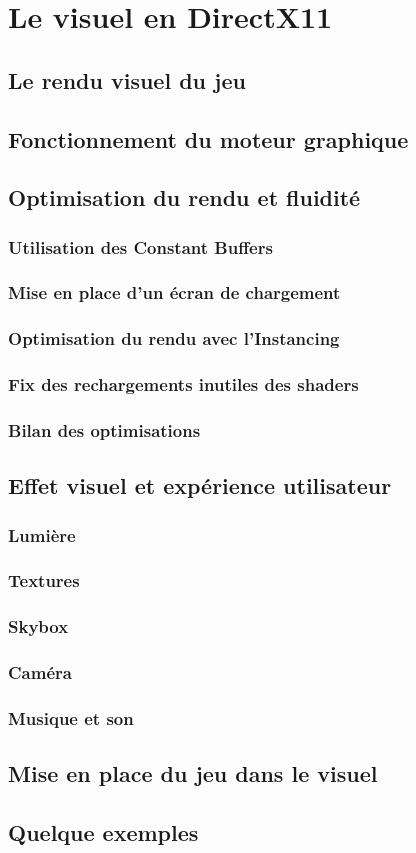 \section{Le visuel en DirectX11}

\subsection{Le rendu visuel du jeu}

\subsection{Fonctionnement du moteur graphique}

\subsection{Optimisation du rendu et fluidité}
\subsubsection{Utilisation des Constant Buffers}
\subsubsection{Mise en place d’un écran de chargement}
\subsubsection{Optimisation du rendu avec l’Instancing}
\subsubsection{Fix des rechargements inutiles des shaders}
\subsubsection{Bilan des optimisations}

\subsection{Effet visuel et expérience utilisateur}
\subsubsection{Lumière}
\subsubsection{Textures}
\subsubsection{Skybox}
\subsubsection{Caméra}
\subsubsection{Musique et son}

\subsection{Mise en place du jeu dans le visuel}

\subsection{Quelque exemples}